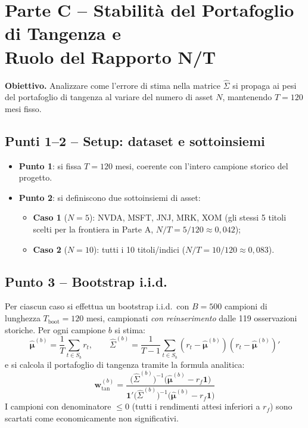\documentclass[11pt]{article}
\begin{document}
\section{Parte C -- Stabilità del Portafoglio di Tangenza e\\
Ruolo del Rapporto N/T}

\textbf{Obiettivo.} Analizzare come l'errore di stima nella matrice
$\hat\Sigma$ si propaga ai pesi del portafoglio di tangenza
al variare del numero di asset $N$, mantenendo $T = 120$ mesi fisso.

\subsection{Punti 1--2 -- Setup: dataset e sottoinsiemi}

\begin{itemize}
  \item \textbf{Punto 1}: si fissa $T = 120$ mesi, coerente con
        l'intero campione storico del progetto.
  \item \textbf{Punto 2}: si definiscono due sottoinsiemi di asset:
        \begin{itemize}
          \item \textbf{Caso 1} ($N{=}5$): NVDA, MSFT, JNJ, MRK, XOM
                (gli stessi 5 titoli scelti per la frontiera in Parte A,
                 $N/T = 5/120 \approx 0{,}042$);
          \item \textbf{Caso 2} ($N{=}10$): tutti i 10 titoli/indici
                ($N/T = 10/120 \approx 0{,}083$).
        \end{itemize}
\end{itemize}

\subsection{Punto 3 -- Bootstrap i.i.d.}

Per ciascun caso si effettua un bootstrap i.i.d.\ con $B = 500$
campioni di lunghezza $T_{\text{boot}} = 120$ mesi, campionati
\emph{con reinserimento} dalle 119 osservazioni storiche.
Per ogni campione $b$ si stima:
\[
  \hat{\boldsymbol\mu}^{(b)} = \frac{1}{T}\sum_{t\in S_b} r_t, \qquad
  \hat\Sigma^{(b)} = \frac{1}{T-1}\sum_{t\in S_b}
    (r_t - \hat{\boldsymbol\mu}^{(b)})(r_t - \hat{\boldsymbol\mu}^{(b)})'
\]
e si calcola il portafoglio di tangenza tramite la formula analitica:
\[
  \mathbf{w}_{\text{tan}}^{(b)} =
  \frac{\bigl(\hat\Sigma^{(b)}\bigr)^{-1}
        \!\bigl(\hat{\boldsymbol\mu}^{(b)} - r_f\mathbf{1}\bigr)}
       {\mathbf{1}'\bigl(\hat\Sigma^{(b)}\bigr)^{-1}
        \!\bigl(\hat{\boldsymbol\mu}^{(b)} - r_f\mathbf{1}\bigr)}
\]
I campioni con denominatore $\leq 0$ (tutti i rendimenti attesi
inferiori a $r_f$) sono scartati come economicamente non significativi.
\end{document}
